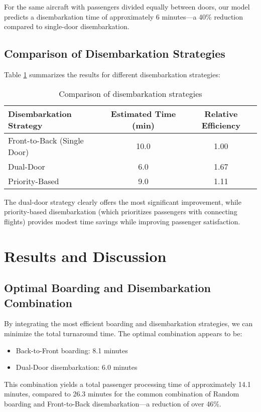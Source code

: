 \documentclass[12pt,a4paper]{article}
\begin{document}
For the same aircraft with passengers divided equally between doors, our model predicts a disembarkation time of approximately 6 minutes—a 40\% reduction compared to single-door disembarkation.

\subsection{Comparison of Disembarkation Strategies}
Table \ref{tab:disembarkation_comparison} summarizes the results for different disembarkation strategies:

\begin{table}[H]
\centering
\begin{tabular}{|l|c|c|}
\hline
\textbf{Disembarkation Strategy} & \textbf{Estimated Time (min)} & \textbf{Relative Efficiency} \\ \hline
Front-to-Back (Single Door) & 10.0 & 1.00 \\ \hline
Dual-Door & 6.0 & 1.67 \\ \hline
Priority-Based & 9.0 & 1.11 \\ \hline
\end{tabular}
\caption{Comparison of disembarkation strategies}
\label{tab:disembarkation_comparison}
\end{table}

The dual-door strategy clearly offers the most significant improvement, while priority-based disembarkation (which prioritizes passengers with connecting flights) provides modest time savings while improving passenger satisfaction.

\section{Results and Discussion}

\subsection{Optimal Boarding and Disembarkation Combination}
By integrating the most efficient boarding and disembarkation strategies, we can minimize the total turnaround time. The optimal combination appears to be:
\begin{itemize}
    \item Back-to-Front boarding: 8.1 minutes
    \item Dual-Door disembarkation: 6.0 minutes
\end{itemize}

This combination yields a total passenger processing time of approximately 14.1 minutes, compared to 26.3 minutes for the common combination of Random boarding and Front-to-Back disembarkation—a reduction of over 46\%.
\end{document}
